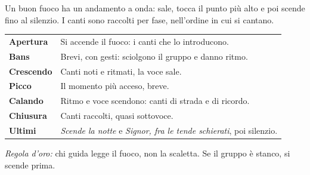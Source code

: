 \begin{center}\begin{minipage}{0.86\textwidth}
Un buon fuoco ha un andamento a onda: sale, tocca il punto più alto e poi scende fino al silenzio.
I canti sono raccolti per fase, nell'ordine in cui si cantano.

\medskip
\begin{tabular}{@{}l@{\hspace{4mm}}p{}@{}}
\textbf{Apertura} & Si accende il fuoco: i canti che lo introducono.\\[1mm]
\textbf{Bans} & Brevi, con gesti: sciolgono il gruppo e danno ritmo.\\[1mm]
\textbf{Crescendo} & Canti noti e ritmati, la voce sale.\\[1mm]
\textbf{Picco} & Il momento più acceso, breve.\\[1mm]
\textbf{Calando} & Ritmo e voce scendono: canti di strada e di ricordo.\\[1mm]
\textbf{Chiusura} & Canti raccolti, quasi sottovoce.\\[1mm]
\textbf{Ultimi} & \textit{Scende la notte} e \textit{Signor, fra le tende schierati}, poi silenzio.
\end{tabular}

\medskip
\textit{Regola d'oro:} chi guida legge il fuoco, non la scaletta. Se il gruppo è stanco, si scende prima.
\end{minipage}\end{center}
